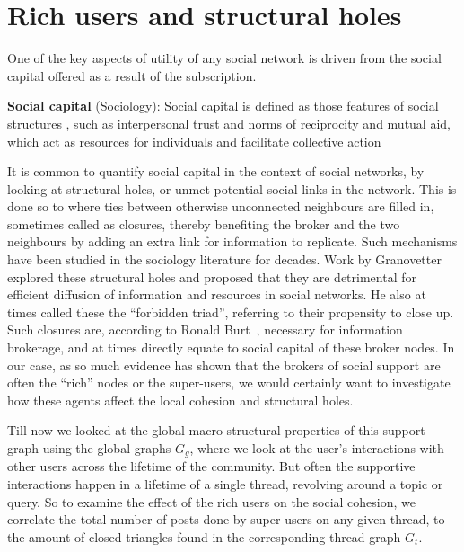 \section{ Rich users and structural holes }
One of the key aspects of utility of any social network is driven from the social capital offered as a result of the subscription. 

\begin{definition}
    \textbf{Social capital} (Sociology): Social capital is defined as those features of social structures , such as interpersonal trust and norms of reciprocity and mutual aid, which act as resources for individuals and facilitate collective action~\cite{collins1993social,coleman1988social}
\end{definition} 

It is common to quantify social capital in the context of social networks, by looking at structural holes, or unmet potential social links in the network. This is done so to where ties between otherwise unconnected neighbours are filled in, sometimes called as closures, thereby benefiting the broker and the two neighbours by adding an extra link for information to replicate. 
Such mechanisms have been studied in the sociology literature for decades. Work by Granovetter~\cite{granovetter1977strength} explored these structural holes and proposed that they are detrimental for efficient diffusion of information and resources in social networks. He also at times called these the ``forbidden triad'', referring to their propensity to close up. Such closures are, according to Ronald Burt~\cite{burt2004structural,burt2009structural}, necessary for information brokerage, and at times directly equate to social capital of these broker nodes.
In our case, as so much evidence has shown that the brokers of social support are often the ``rich'' nodes or the super-users, we would certainly want to investigate how these agents affect the local cohesion and structural holes.

Till now we looked at the global macro structural properties of this support graph using the global graphs $G_g$, where we look at the user's interactions with other users across the lifetime of the community. But often the supportive interactions happen in a lifetime of a single thread, revolving around a topic or query. So to examine the effect of the rich users on the social cohesion, we correlate the total number of posts done by super users on any given thread, to the amount of closed triangles found in the corresponding thread graph $G_t$.  

